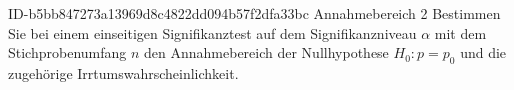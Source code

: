 \begin{exercise}
      {ID-b5bb847273a13969d8c4822dd094b57f2dfa33bc}
      {Annahmebereich 2}
  \ifproblem\problem
    Bestimmen Sie bei einem einseitigen Signifikanztest auf dem Signifikanzniveau
    $\alpha$ mit dem Stichprobenumfang $n$ den Annahmebereich der Nullhypothese
    $H_0:p=p_0$ und die zugehörige Irrtumswahrscheinlichkeit.
    \begin{center}
      \qquad
      \qquad
      \\[1ex]
      \qquad
      \qquad
      \qquad
    \end{center}
  \fi
\end{exercise}
